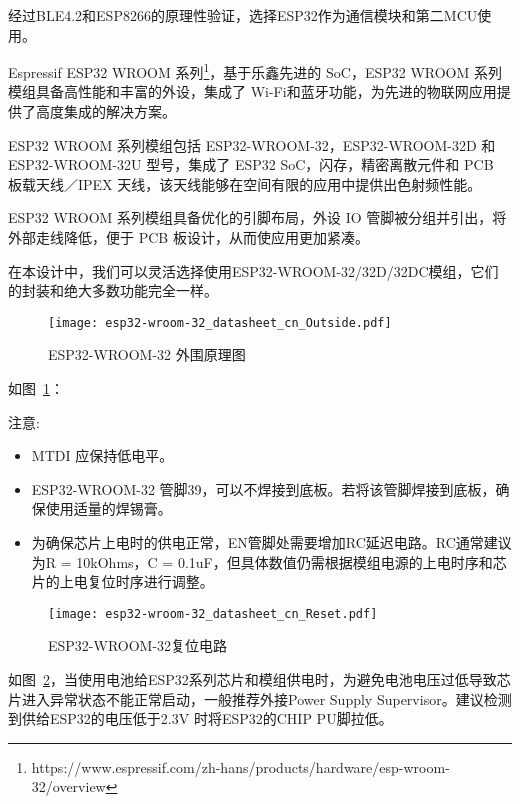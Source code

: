 经过BLE4.2和ESP8266的原理性验证，选择ESP32作为通信模块和第二MCU使用。

Espressif ESP32 WROOM 系列\footnote{https://www.espressif.com/zh-hans/products/hardware/esp-wroom-32/overview}，基于乐鑫先进的 SoC，ESP32 WROOM 系列模组具备高性能和丰富的外设，集成了 Wi-Fi和蓝牙功能，为先进的物联网应用提供了高度集成的解决方案。

ESP32 WROOM 系列模组包括 ESP32-WROOM-32，ESP32-WROOM-32D 和 ESP32-WROOM-32U 型号，集成了 ESP32 SoC，闪存，精密离散元件和 PCB 板载天线／IPEX 天线，该天线能够在空间有限的应用中提供出色射频性能。

ESP32 WROOM 系列模组具备优化的引脚布局，外设 IO 管脚被分组并引出，将外部走线降低，便于 PCB 板设计，从而使应用更加紧凑。

在本设计中，我们可以灵活选择使用ESP32-WROOM-32/32D/32DC模组，它们的封装和绝大多数功能完全一样。

\begin{figure}[htbp]
    \centering
    \texttt{[image: esp32-wroom-32\_datasheet\_cn\_Outside.pdf]}
    \caption{ESP32-WROOM-32 外围原理图}
    \label{fig:ESP32Outside}
\end{figure}

如图~\ref{fig:ESP32Outside}：

注意:

\begin{itemize}
    \item MTDI 应保持低电平。
    \item ESP32-WROOM-32 管脚39，可以不焊接到底板。若将该管脚焊接到底板，确保使用适量的焊锡膏。
    \item 为确保芯片上电时的供电正常，EN管脚处需要增加RC延迟电路。RC通常建议为R = 10kOhms，C = 0.1uF，但具体数值仍需根据模组电源的上电时序和芯片的上电复位时序进行调整。
\end{itemize}

\begin{figure}[htbp]
    \centering
    \texttt{[image: esp32-wroom-32\_datasheet\_cn\_Reset.pdf]}
    \caption{ESP32-WROOM-32复位电路}
    \label{fig:ESP32Reset}
\end{figure}

如图~\ref{fig:ESP32Reset}，当使用电池给ESP32系列芯片和模组供电时，为避免电池电压过低导致芯片进入异常状态不能正常启动，一般推荐外接Power Supply Supervisor。建议检测到供给ESP32的电压低于2.3V 时将ESP32的CHIP PU脚拉低。


